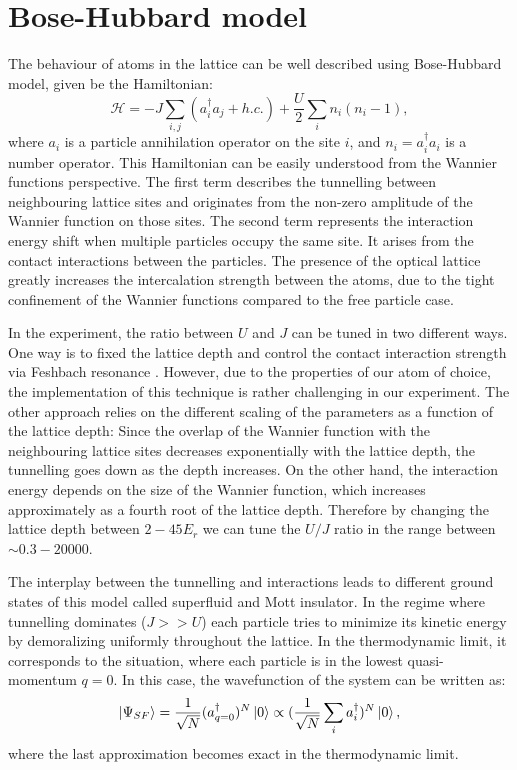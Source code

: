\section{Bose-Hubbard model}
The behaviour of atoms in the lattice can be well described using Bose-Hubbard model, given be the Hamiltonian:
\begin{equation}
\mathcal{H} = -J\sum_{i,j} (a_i^\dagger a_j + h.c.) + \frac{U}{2} \sum_i n_i(n_i-1),
\end{equation}
where $a_i$ is a particle annihilation operator on the site $i$, and $n_i = a_i^\dagger a_i$ is a number operator. This Hamiltonian can be easily understood from the Wannier functions perspective. The first term describes the tunnelling between neighbouring lattice sites and originates from the non-zero amplitude of the Wannier function on those sites. The second term represents the interaction energy shift when multiple particles occupy the same site. It arises from the contact interactions between the particles. The presence of the optical lattice greatly increases the intercalation strength between the atoms, due to the tight confinement of the Wannier functions compared to the free particle case.

In the experiment, the ratio between $U$ and $J$ can be tuned in two different ways. One way is to fixed the lattice depth and control the contact interaction strength via Feshbach resonance \cite{Chin2010}. However, due to the properties of our atom of choice, the implementation of this technique is rather challenging in our experiment. The other approach relies on the different scaling of the parameters as a function of the lattice depth: Since the overlap of the Wannier function with the neighbouring lattice sites decreases exponentially with the lattice depth, the tunnelling goes down as the depth increases. On the other hand, the interaction energy depends on the size of the Wannier function, which increases approximately as a fourth root of the lattice depth. Therefore by changing the lattice depth between $2-45 E_r$ we can tune the $U/J$ ratio in the range between $\sim 0.3-20000$.

The interplay between the tunnelling and interactions leads to different ground states of this model called superfluid and Mott insulator. In the regime where tunnelling dominates ($J>>U$) each particle tries to minimize its kinetic energy by demoralizing uniformly throughout the lattice. In the thermodynamic limit, it corresponds to the situation, where each particle is in the lowest quasi-momentum $q=0$. In this case, the wavefunction of the system can be written as:
\begin{equation}
\left|\Psi_{SF}\right\rangle = \frac{1}{\sqrt{N}}(a_{q=0}^\dagger)^N\left|0\right\rangle \propto (\frac{1}{\sqrt{N}}\sum_i a_i^\dagger)^N\left|0\right\rangle,
\end{equation}
where the last approximation becomes exact in the thermodynamic limit.


